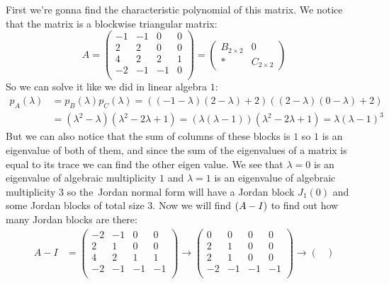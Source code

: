 \documentclass[11pt, a4paper]{article}
\begin{document}
\begin{solution}
  First we're gonna find the characteristic polynomial of this matrix. We
  notice that the matrix is a blockwise triangular matrix:
  \[ A = 
  \begin{pmatrix}
  -1 & -1 & 0 & 0\\
  2 & 2 & 0 & 0\\
  4 & 2 & 2 & 1\\
  -2 & -1 & -1 & 0\\
  \end{pmatrix}
    =
  \begin{pmatrix}
  B_{2\times 2} & 0\\
  * & C_{2\times 2}
  \end{pmatrix}
  \]
  So we can solve it like we did in linear algebra $1$:
  \begin{align*}
    p_A(\lambda) &= p_B(\lambda)p_C(\lambda) = 
    ((-1-\lambda)(2-\lambda)+2)((2-\lambda)(0-\lambda)+2) \\
    &= (\lambda^2-\lambda)(\lambda^2-2\lambda+1) = 
       (\lambda(\lambda-1))(\lambda^2-2\lambda+1) = 
       \lambda(\lambda-1)^3
  \end{align*}
  But we can also notice that the sum of columns of these blocks is $1$ so
  $1$ is an eigenvalue of both of them, and since the sum of the eigenvalues
  of a matrix is equal to its trace we can find the other eigen value.
  We see that $\lambda = 0$ is an eigenvalue of algebraic multiplicity $1$
  and $\lambda = 1$ is an eigenvalue of algebraic multiplicity $3$ so the\
  Jordan normal form will have a Jordan block $J_1(0)$ and some Jordan blocks
  of total size $3$. Now we will find $\null(A-I)$ to find out how many Jordan
  blocks are there:
  \begin{align*}
      A-I &= 
  \begin{pmatrix}
    -2 & -1 & 0 & 0\\
    2 & 1 & 0 & 0\\
    4 & 2 & 1 & 1\\
    -2 & -1 & -1 & -1\\
  \end{pmatrix} \to
  \begin{pmatrix}
    0 & 0 & 0 & 0\\
    2 & 1 & 0 & 0\\
    2 & 1 & 0 & 0\\
    -2 & -1 & -1 & -1\\
  \end{pmatrix} \to
  \begin{pmatrix}

\end{pmatrix}
\end{align*}
\end{solution}
\end{document}
